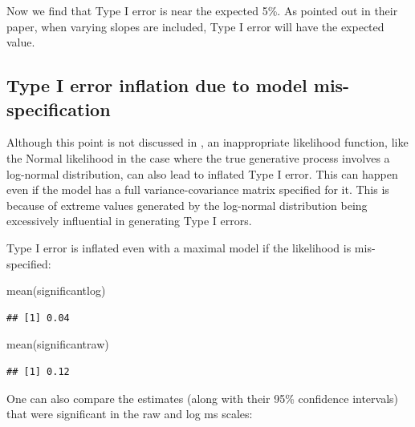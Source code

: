 \documentclass[
  12pt,
]{krantz}
\newenvironment{Shaded}{\begin{snugshade}}{\end{snugshade}}
\newcommand{\FunctionTok}[1]{\textcolor[rgb]{0.00,0.00,0.00}{#1}}
\newcommand{\NormalTok}[1]{#1}
\theoremstyle{definition}
\theoremstyle{definition}
\theoremstyle{definition}
\theoremstyle{definition}
\theoremstyle{remark}
\begin{document}
Now we find that Type I error is near the expected 5\%. As \citet{barr2013} pointed out in their paper, when varying slopes are included, Type I error will have the expected value.

\hypertarget{type-i-error-inflation-due-to-model-mis-specification}{%
\subsection{Type I error inflation due to model mis-specification}\label{type-i-error-inflation-due-to-model-mis-specification}}

Although this point is not discussed in \citet{barr2013}, an inappropriate likelihood function, like the Normal likelihood in the case where the true generative process involves a log-normal distribution, can also lead to inflated Type I error. This can happen even if the model has a full variance-covariance matrix specified for it. This is because of extreme values generated by the log-normal distribution being excessively influential in generating Type I errors.

Type I error is inflated even with a maximal model if the likelihood is mis-specified:

\begin{Shaded}
\begin{Highlighting}[]
\FunctionTok{mean}\NormalTok{(significantlog)}
\end{Highlighting}
\end{Shaded}

\begin{verbatim}
## [1] 0.04
\end{verbatim}

\begin{Shaded}
\begin{Highlighting}[]
\FunctionTok{mean}\NormalTok{(significantraw)}
\end{Highlighting}
\end{Shaded}

\begin{verbatim}
## [1] 0.12
\end{verbatim}

One can also compare the estimates (along with their 95\% confidence intervals) that were significant in the raw and log ms scales:
\end{document}
